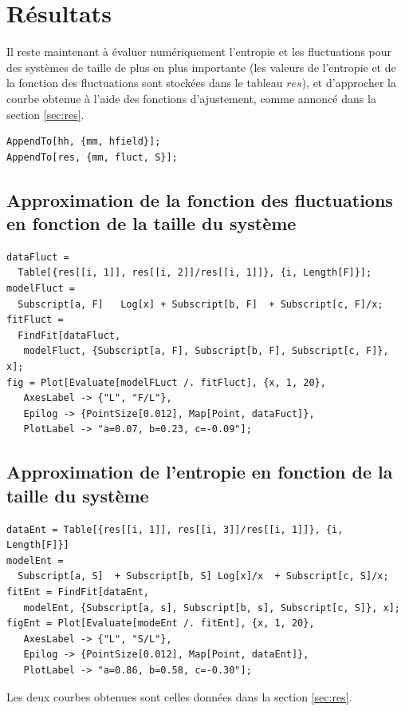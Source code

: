\documentclass[a4paper, french]{report}
\newcommand{\1}{\ensuremath{\ket{\om_1\bom_1}}\xspace}
\newcommand{\2}{\ensuremath{\ket{\om_2\bom_2}}\xspace}
\begin{document}
\section{Résultats}
Il reste maintenant à évaluer numériquement l'entropie et les fluctuations pour des systèmes de taille de plus en plus importante (les valeurs de l'entropie et de la fonction des fluctuations sont stockées dans le tableau $res$), et d'approcher la courbe obtenue à l'aide des fonctions d'ajustement, comme annoncé dans la section \ref{sec:res}.

\begin{lstlisting}
AppendTo[hh, {mm, hfield}];
AppendTo[res, {mm, fluct, S}];
\end{lstlisting}

\subsection{Approximation de la fonction des fluctuations en fonction de la taille du système}
\begin{lstlisting}
dataFluct = 
  Table[{res[[i, 1]], res[[i, 2]]/res[[i, 1]]}, {i, Length[F]}];
modelFluct = 
  Subscript[a, F]   Log[x] + Subscript[b, F]  + Subscript[c, F]/x;
fitFluct = 
  FindFit[dataFluct, 
   modelFluct, {Subscript[a, F], Subscript[b, F], Subscript[c, F]}, x];
fig = Plot[Evaluate[modelFLuct /. fitFluct], {x, 1, 20}, 
   AxesLabel -> {"L", "F/L"}, 
   Epilog -> {PointSize[0.012], Map[Point, dataFuct]}, 
   PlotLabel -> "a=0.07, b=0.23, c=-0.09"];
\end{lstlisting}

\subsection{Approximation de l'entropie en fonction de la taille du système}
\begin{lstlisting}
dataEnt = Table[{res[[i, 1]], res[[i, 3]]/res[[i, 1]]}, {i, Length[F]}]
modelEnt = 
  Subscript[a, S]  + Subscript[b, S] Log[x]/x  + Subscript[c, S]/x;
fitEnt = FindFit[dataEnt, 
   modelEnt, {Subscript[a, s], Subscript[b, s], Subscript[c, S]}, x];
figEnt = Plot[Evaluate[modeEnt /. fitEnt], {x, 1, 20}, 
   AxesLabel -> {"L", "S/L"}, 
   Epilog -> {PointSize[0.012], Map[Point, dataEnt]}, 
   PlotLabel -> "a=0.86, b=0.58, c=-0.30"];
\end{lstlisting}

Les deux courbes obtenues sont celles données dans la section \ref{sec:res}.
\end{document}
